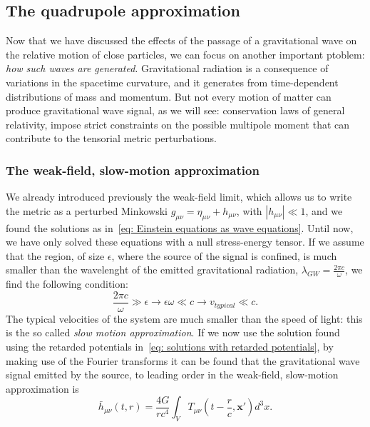 \subsection{The quadrupole approximation}
Now that we have discussed the effects of the passage of a gravitational wave on the relative motion of close particles, we can focus on another important ptoblem: \textit{how such waves are generated}.
Gravitational radiation is a consequence of variations in the spacetime curvature, and it generates from time-dependent distributions of mass and momentum.
But not every motion of matter can produce gravitational wave signal, as we will see: conservation laws of general relativity, impose strict constraints on the possible multipole moment that can contribute to the tensorial metric perturbations.


\subsubsection{The weak-field, slow-motion approximation}
We already introduced previously the weak-field limit, which allows us to write the metric as a perturbed Minkowski $g_{\mu\nu}=\eta_{\mu\nu} + h_{\mu\nu}$, with $|h_{\mu\nu}|\ll 1$, and we found the solutions as in~\eqref{eq: Einstein equations as wave equations}.
Until now, we have only solved these equations with a null stress-energy tensor.
If we assume that the region, of size $\epsilon$, where the source of the signal is confined, is much smaller than the wavelenght of the emitted gravitational radiation, $\lambda_{GW} = \frac{2\pi c}{\omega}$, we find the following condition:
\begin{equation}
    \frac{2\pi c}{\omega}\gg \epsilon \to \epsilon\omega \ll c \to v_{typical} \ll c.
    \label{eq: slow motion approximation}
\end{equation}
The typical velocities of the system are much smaller than the speed of light: this is the so called \textit{slow motion approximation}.
If we now use the solution found using the retarded potentials in~\eqref{eq: solutions with retarded potentials}, by making use of the Fourier transforms it can be found that the gravitational wave signal emitted by the source, to leading order in the weak-field, slow-motion approximation is
\begin{equation}
    \bar{h}_{\mu\nu}(t,r) = \frac{4G}{rc^4}\int_V T_{\mu\nu}(t-\frac{r}{c}, \mathbf{x}')d^3x.
    \label{eq: weak-field slow-motion solutions}
\end{equation}

